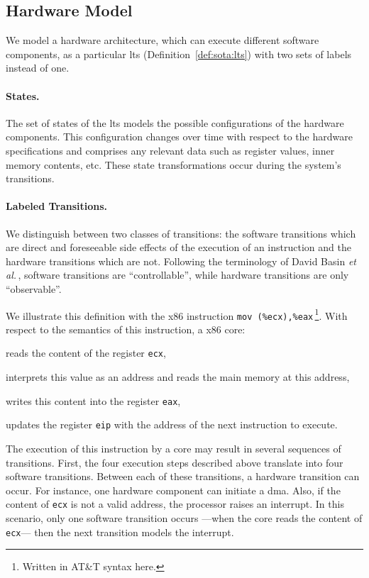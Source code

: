 \subsection{Hardware Model}
\label{subsec:speccert:hardware}

We model a hardware architecture, which can execute different software
components, as a particular \ac{lts} (Definition~\ref{def:sota:lts})  with two
sets of labels instead of one.

\paragraph{States.}
%
The set of states of the \ac{lts} models the possible configurations of the
hardware components.
%
This configuration changes over time with respect to the hardware specifications
and comprises any relevant data such as register values, inner memory contents,
etc.
%
These state transformations occur during the system's transitions.

\paragraph{Labeled Transitions.}
%
We distinguish between two classes of transitions: the software transitions
which are direct and foreseeable side effects of the execution of an instruction
and the hardware transitions which are not.
%
Following the terminology of David Basin \emph{et
  al.}\,\cite{basin2013enforceable}, software transitions are ``controllable'',
while hardware transitions are only ``observable''.

We illustrate this definition with the x86 instruction \texttt{mov
  (\%ecx),\%eax}\,\footnote{Written in AT\&T syntax here.}.
%
With respect to the semantics of this instruction, a x86 core:
%
\begin{inparaenum}[(1)]
\item reads the content of the register \texttt{ecx},
%
\item interprets this value as an address and reads the main memory at this
  address,
%
\item writes this content into the register \texttt{eax},
%
\item updates the register \texttt{eip} with the address of the next instruction
  to execute.
\end{inparaenum}
%
The execution of this instruction by a core may result in several sequences of
transitions.
%
First, the four execution steps described above translate into four software
transitions.
%
Between each of these transitions, a hardware transition can occur.
%
For instance, one hardware component can initiate a \ac{dma}.
%
Also, if the content of \texttt{ecx} is not a valid address, the processor
raises an interrupt.
%
In this scenario, only one software transition occurs ---when the core reads the
content of \texttt{ecx}--- then the next transition models the interrupt.

